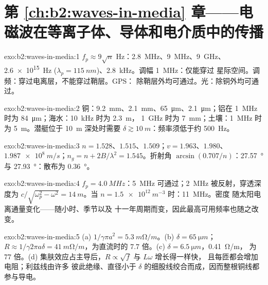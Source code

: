 \section*{第 \ref{ch:b2:waves-in-media} 章——电磁波在等离子体、导体和电介质中的传播}

\begin{solution}{exo:b2:waves-in-media:1}
$f_p \approx 9\sqrt n$ Hz：\qty{2.8}{MHz}、\qty{9}{MHz}、\qty{9}{GHz}、\qty{2.6e15}{Hz}
($\lambda_p = \qty{115}{nm}$)、\qty{2.8}{kHz}。调幅 \qty{1}{MHz}：仅能穿过
星际空间。调频：穿过电离层，不能穿过鞘层。GPS：
除鞘层外均可通过。光：除铜外均可通过。
\end{solution}

\begin{solution}{exo:b2:waves-in-media:2}
铜：\qty{9.2}{mm}、\qty{2.1}{mm}、\qty{65}{\micro m}、\qty{2.1}{\micro m}；铝在
\qty{1}{MHz} 时为 \qty{84}{\micro m}；海水：\qty{10}{kHz} 时为 \qty{2.3}{m}，
\qty{1}{GHz} 时为 \qty{7}{mm}；土壤：\qty{1}{MHz} 时为 \qty{5}{m}。潜艇位于 \qty{10}{m} 深处时需要 $\delta
\gtrsim \qty{10}{m}$：频率须低于约 \qty{500}{Hz}。
\end{solution}

\begin{solution}{exo:b2:waves-in-media:3}
$n = 1.528$、$1.515$、$1.509$；$v = 1.963$、$1.980$、$\qty{1.987e8}{m/s}$；$n_g = n +
2B/\lambda^2 = 1.545$。折射角 $\arcsin(0.707/n)$：\qty{27.57}{\degree} 与
\qty{27.93}{\degree}：散布为 \qty{0.36}{\degree}。
\end{solution}

\begin{solution}{exo:b2:waves-in-media:4}
$f_p = \qty{4.0}{MHz}$：\qty{5}{MHz} 可通过；\qty{2}{MHz} 被反射，穿透深度为
$c/\sqrt{\omega_p^2 - \omega^2} = \qty{14}{m}$。当 $n = \qty{1.5e12}{m^{-3}}$ 时：\qty{11}{MHz}。密度
随太阳电离通量变化——随小时、季节以及
十一年周期而变，因此最高可用频率也随之改变。
\end{solution}

\begin{solution}{exo:b2:waves-in-media:5}
(a) $1/\gamma\pi a^2 = \qty{5.3}{m\ohm/m}$。(b) $\delta = \qty{65}{\micro m}$；$R \approx 1/\gamma2\pi a\delta
= \qty{41}{m\ohm/m}$，为直流时的 $7.7$ 倍。(c) $\delta = \qty{6.5}{\micro m}$，\qty{0.41}{\ohm/m}，
为 $77$ 倍。(d) 集肤效应占主导后，$R \propto \sqrt f$ 与 $L\omega$ 增长得一样快，
且每匝都会增加电阻；利兹线由许多
彼此绝缘、直径小于 $\delta$ 的细股线绞合而成，因而整根铜线都参与导电。
\end{solution}

